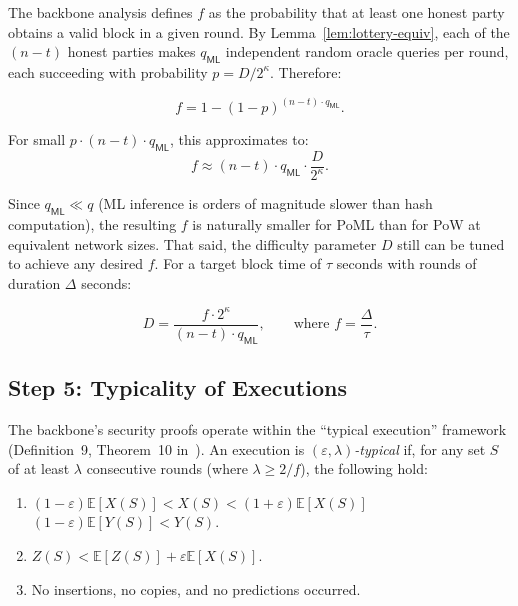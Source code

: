 The backbone analysis defines $f$ as the probability that at least one honest party obtains a valid block in a given round. By Lemma~\ref{lem:lottery-equiv}, each of the $(n - t)$ honest parties makes $q_{\mathsf{ML}}$ independent random oracle queries per round, each succeeding with probability $p = D / 2^\kappa$. Therefore:

\[
    f = 1 - (1 - p)^{(n-t) \cdot q_{\mathsf{ML}}}.
\]

For small $p \cdot (n-t) \cdot q_{\mathsf{ML}}$, this approximates to:
\[
    f \approx (n - t) \cdot q_{\mathsf{ML}} \cdot \frac{D}{2^\kappa}.
\]

Since $q_{\mathsf{ML}} \ll q$ (ML inference is orders of magnitude slower than hash computation), the resulting $f$ is naturally smaller for PoML than for PoW at equivalent network sizes. That said, the difficulty parameter $D$ still can be tuned to achieve any desired $f$. For a target block time of $\tau$ seconds with rounds of duration $\Delta$ seconds:



\[
    D = \frac{f \cdot 2^\kappa}{(n - t) \cdot q_{\mathsf{ML}}}, \qquad \text{where } f = \frac{\Delta}{\tau}.
\]


\subsection{Step 5: Typicality of Executions}

The backbone's security proofs operate within the ``typical execution'' framework (Definition~9, Theorem~10 in~\cite{GKL20}). An execution is \emph{$(\varepsilon, \lambda)$-typical} if, for any set $S$ of at least $\lambda$ consecutive rounds (where $\lambda \geq 2/f$), the following hold:
\begin{enumerate}
    \item[(a)] $(1 - \varepsilon)\mathbb{E}[X(S)] < X(S) < (1 + \varepsilon)\mathbb{E}[X(S)]$  \\ $(1 - \varepsilon)\mathbb{E}[Y(S)] < Y(S)$.
    \item[(b)] $Z(S) < \mathbb{E}[Z(S)] + \varepsilon \mathbb{E}[X(S)]$.
    \item[(c)] No insertions, no copies, and no predictions occurred.
\end{enumerate}


